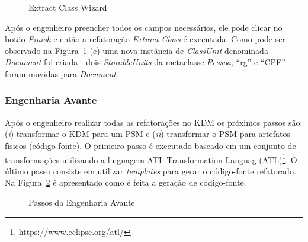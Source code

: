 \begin{figure}[!h]
 \centering
\caption{Extract Class Wizard}
 \label{fig:wizard}
\end{figure}

Após o engenheiro preencher todos os campos necessários, ele pode clicar no botão \textit{Finish} e então a refatoração \textit{Extract Class} é executada. Como pode ser observado na Figura~\ref{fig:wizard} (c) uma nova instância de \textit{ClassUnit} denominada \textit{Document} foi criada - dois \textit{StorableUnits} da metaclasse \textit{Pessoa}, ``rg'' e ``CPF'' foram movidas para \textit{Document}.


 \subsubsection{Engenharia Avante}

Após o engenheiro realizar todas as refatorações no KDM os próximos passos são: (\textit{i}) transformar o KDM para um PSM e (\textit{ii}) transformar o PSM para artefatos físicos (código-fonte). O primeiro passo é executado baseado em um conjunto de transformações utilizando a linguagem ATL Transformation Languag (ATL)\footnote{https://www.eclipse.org/atl/}. O último passo consiste em utilizar \textit{templates} para gerar o código-fonte refatorado.  Na Figura~\ref{fig:forward} é apresentado como é feita a geração de código-fonte.

\begin{figure}[!h]
 \centering
\caption{Passos da Engenharia Avante}
 \label{fig:forward}
\end{figure}


